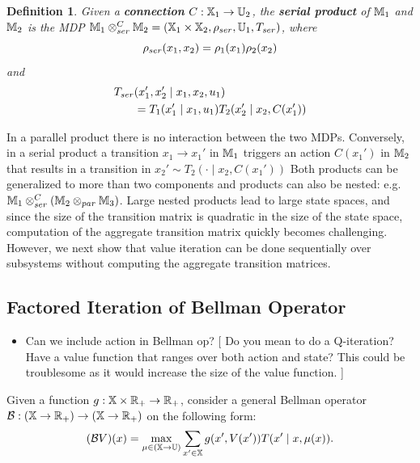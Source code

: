 \documentclass[conference]{IEEEtran}
\newtheorem{definition}{Definition}
\newcommand{\red}[1]{{\color{red} #1 }}
\newcommand{\sofie}[1]{{\color{orange}[ #1 ]}}
\begin{document}
\begin{definition}
  Given a \textbf{connection} $C : \mathbb{X}_1 \rightarrow \mathbb{U}_2$, the \textbf{serial product} of $\mathbb{M}_1$ and $\mathbb{M}_2$ is the MDP $\mathbb{M}_1 \otimes_{ser}^C \mathbb{M}_2 = (\mathbb{X}_1 \times \mathbb{X}_2, \rho_{ser}, \mathbb{U}_1, T_{ser})$,
  where
  \begin{equation}
    \rho_{ser}(x_1, x_2) = \rho_1(x_1) \rho_2(x_2)
  \end{equation}
  and
  \begin{equation}\label{eq:serial}
  \begin{aligned}
      \tr_{ser}&(x_1', x_2' \mid x_1, x_2, u_1) \\
      & = \tr_1 (x_1' \mid x_1, u_1) \tr_2 (x_2' \mid x_2, C(x_1') )
  \end{aligned}
  \end{equation}
\end{definition}
In a parallel product there is no interaction between the two MDPs. Conversely, in a serial product a transition $x_1 \rightarrow x_1'$ in $\mathbb{M}_1$ triggers an action $C(x_1')$ in $\mathbb{M}_2$ that results in a transition in $x_2' \sim T_2(\cdot \mid x_2, C(x_1'))$
Both products can be generalized to more than two components and products can also be nested: e.g. $\mathbb{M}_1 \otimes_{ser}^C \left( \mathbb{M}_2 \otimes_{par} \mathbb{M}_3 \right)$. Large nested products lead to large state spaces, and since the size of the transition matrix is quadratic in the size of the state space, computation of the aggregate transition matrix quickly becomes challenging. However, we next show that value iteration can be done sequentially over subsystems without computing the aggregate transition matrices.


\subsection{Factored Iteration of Bellman Operator}

\begin{itemize}
  \item \red{Can we include action in Bellman op?}\sofie{Do you mean to do a Q-iteration? Have a value function that ranges over both action and state? This could be troublesome as it would increase the size of the value function.}
\end{itemize}


Given a function $g: \mathbb{X} \times \mathbb{R}_+ \rightarrow \mathbb{R}_+$, consider a general Bellman operator $\mathcal{B} : (\mathbb{X} \rightarrow \mathbb{R}_+) \rightarrow (\mathbb{X} \rightarrow \mathbb{R}_+)$ on the following form:
\begin{equation}
  (\mathcal{B} V) (x) = \max_{\mu \in (\mathbb{X} \rightarrow \mathbb{U})} \sum_{x' \in \mathbb{X}}  g(x', V(x')) T(x' \mid x, \mu(x)).
\end{equation}
\end{document}
